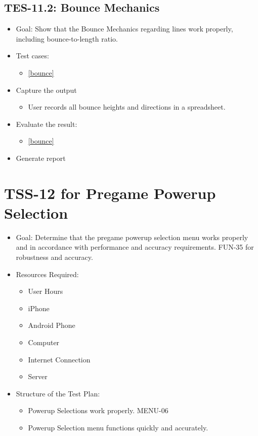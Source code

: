 \subsection{TES-11.2: Bounce Mechanics }
\begin{itemize}
\item Goal: Show that the Bounce Mechanics regarding lines work properly, including
bounce-to-length ratio. 
\item Test cases: 

\begin{itemize}
\item \ref{bounce}
\end{itemize}
\item Capture the output
\begin{itemize}
\item User records all bounce heights and directions in a spreadsheet.
\end{itemize}
\item Evaluate the result: 
\begin{itemize}
\item \ref{bounce}
\end{itemize}
\item Generate report 
\end{itemize}




\section{TSS-12 for Pregame Powerup Selection}
\begin{itemize}
\item Goal: Determine that the pregame powerup selection menu works properly and in accordance
with performance and accuracy requirements. FUN-35
for robustness and accuracy.

\item Resources Required:
\begin{itemize}
\item User Hours 
\item iPhone 
\item Android Phone 
\item Computer 
\item Internet Connection 
\item Server
\end{itemize}
\item Structure of the Test Plan: 

\begin{itemize}

\item Powerup Selections work properly. MENU-06
\item Powerup Selection menu functions quickly and accurately.
\end{itemize}
\end{itemize}

